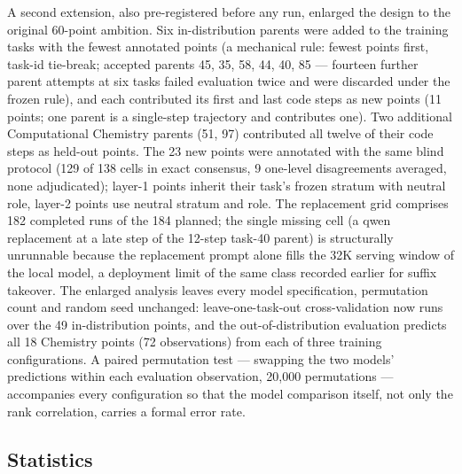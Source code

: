 A second extension, also pre-registered before any run, enlarged the design to the original 60-point ambition. Six in-distribution parents were added to the training tasks with the fewest annotated points (a mechanical rule: fewest points first, task-id tie-break; accepted parents 45, 35, 58, 44, 40, 85 --- fourteen further parent attempts at six tasks failed evaluation twice and were discarded under the frozen rule), and each contributed its first and last code steps as new points (11 points; one parent is a single-step trajectory and contributes one). Two additional Computational Chemistry parents (51, 97) contributed all twelve of their code steps as held-out points. The 23 new points were annotated with the same blind protocol (129 of 138 cells in exact consensus, 9 one-level disagreements averaged, none adjudicated); layer-1 points inherit their task's frozen stratum with neutral role, layer-2 points use neutral stratum and role. The replacement grid comprises 182 completed runs of the 184 planned; the single missing cell (a qwen replacement at a late step of the 12-step task-40 parent) is structurally unrunnable because the replacement prompt alone fills the 32K serving window of the local model, a deployment limit of the same class recorded earlier for suffix takeover. The enlarged analysis leaves every model specification, permutation count and random seed unchanged: leave-one-task-out cross-validation now runs over the 49 in-distribution points, and the out-of-distribution evaluation predicts all 18 Chemistry points (72 observations) from each of three training configurations. A paired permutation test --- swapping the two models' predictions within each evaluation observation, 20,000 permutations --- accompanies every configuration so that the model comparison itself, not only the rank correlation, carries a formal error rate.

\subsection*{Statistics}

